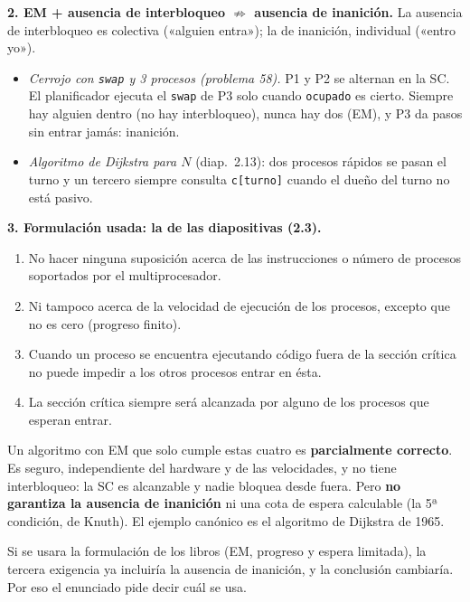\begin{solucion}
\textbf{2. EM + ausencia de interbloqueo $\not\Rightarrow$ ausencia de inanición.} La ausencia de interbloqueo
es colectiva («alguien entra»); la de inanición, individual («entro yo»).
\begin{itemize}[leftmargin=*]
  \item \emph{Cerrojo con \texttt{swap} y 3 procesos (problema 58).} P1 y P2 se alternan en la SC. El
        planificador ejecuta el \texttt{swap} de P3 solo cuando \texttt{ocupado} es cierto. Siempre hay alguien
        dentro (no hay interbloqueo), nunca hay dos (EM), y P3 da pasos sin entrar jamás: inanición.
  \item \emph{Algoritmo de Dijkstra para $N$} (diap.\ 2.13): dos procesos rápidos se pasan el turno y un tercero
        siempre consulta \texttt{c[turno]} cuando el dueño del turno no está pasivo.
\end{itemize}

\textbf{3. Formulación usada: la de las diapositivas (2.3).}
\begin{enumerate}[leftmargin=*,noitemsep]
  \item No hacer ninguna suposición acerca de las instrucciones o número de procesos soportados por el
        multiprocesador.
  \item Ni tampoco acerca de la velocidad de ejecución de los procesos, excepto que no es cero (progreso finito).
  \item Cuando un proceso se encuentra ejecutando código fuera de la sección crítica no puede impedir a los otros
        procesos entrar en ésta.
  \item La sección crítica siempre será alcanzada por alguno de los procesos que esperan entrar.
\end{enumerate}
Un algoritmo con EM que solo cumple estas cuatro es \textbf{parcialmente correcto}. Es seguro, independiente del
hardware y de las velocidades, y no tiene interbloqueo: la SC es alcanzable y nadie bloquea desde fuera. Pero
\textbf{no garantiza la ausencia de inanición} ni una cota de espera calculable (la 5ª condición, de Knuth). El
ejemplo canónico es el algoritmo de Dijkstra de 1965.

Si se usara la formulación de los libros (EM, progreso y espera limitada), la tercera exigencia ya incluiría la
ausencia de inanición, y la conclusión cambiaría. Por eso el enunciado pide decir cuál se usa.
\end{solucion}

